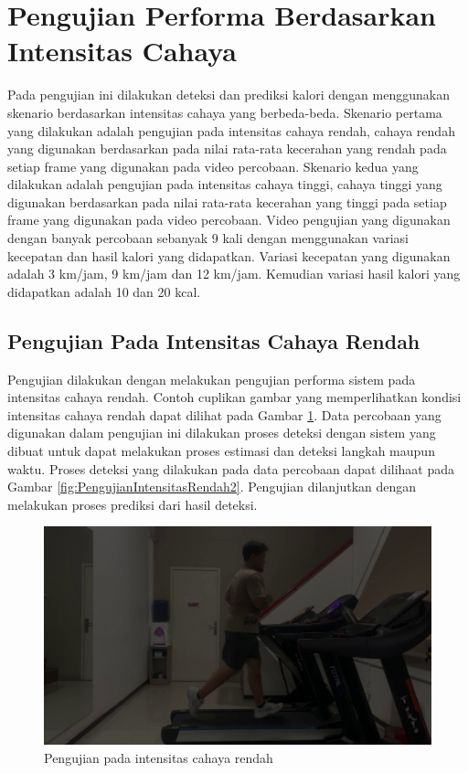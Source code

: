 \section{Pengujian Performa Berdasarkan Intensitas Cahaya}
\label{sec:PengujianIntensitas}

Pada pengujian ini dilakukan deteksi dan prediksi kalori dengan menggunakan skenario berdasarkan intensitas cahaya yang berbeda-beda. Skenario pertama yang dilakukan adalah pengujian pada intensitas cahaya rendah, cahaya rendah yang digunakan berdasarkan pada nilai rata-rata kecerahan yang rendah pada setiap frame yang digunakan pada video percobaan. Skenario kedua yang dilakukan adalah pengujian pada intensitas cahaya tinggi, cahaya tinggi yang digunakan berdasarkan pada nilai rata-rata kecerahan yang tinggi pada setiap frame yang digunakan pada video percobaan. Video pengujian yang digunakan dengan banyak percobaan sebanyak 9 kali dengan menggunakan variasi kecepatan dan hasil kalori yang didapatkan. Variasi kecepatan yang digunakan adalah 3 km/jam, 9 km/jam dan 12 km/jam. Kemudian variasi hasil kalori yang didapatkan adalah 10 dan 20 kcal. 

\subsection{Pengujian Pada Intensitas Cahaya Rendah}
\label{subsec:PengujianIntensitasRendah}

Pengujian dilakukan dengan melakukan pengujian performa sistem pada intensitas cahaya rendah. Contoh cuplikan gambar yang memperlihatkan kondisi intensitas cahaya rendah dapat dilihat pada Gambar \ref{fig:PengujianIntensitasRendah}. Data percobaan yang digunakan dalam pengujian ini dilakukan proses deteksi dengan sistem yang dibuat untuk dapat melakukan proses estimasi dan deteksi langkah maupun waktu. Proses deteksi yang dilakukan pada data percobaan dapat dilihaat pada Gambar \ref{fig:PengujianIntensitasRendah2}. Pengujian dilanjutkan dengan melakukan proses prediksi dari hasil deteksi.

\begin{figure}[H]
  \centering
  \includegraphics[scale=0.5]{gambar/cahaya_rendah.png}
  \caption{Pengujian pada intensitas cahaya rendah}
  \label{fig:PengujianIntensitasRendah}
\end{figure}

